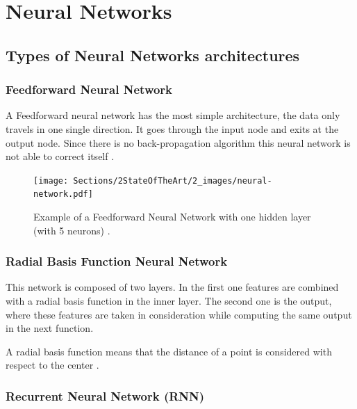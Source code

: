 \appendix
\chapter{Neural Networks}

\label{ch:appendix}

\section{Types of Neural Networks architectures}

            \subsection{Feedforward Neural Network}
            
            \par A Feedforward neural network has the most simple architecture, the data only travels in one single direction. It goes through the input node and exits at the output node. Since there is no back-propagation algorithm this neural network is not able to correct itself \cite{ArmaanMerchant2018} \cite{VikasGupta2017}.

            \begin{figure}[H]
                \centering
                \captionsetup{justification=centering}
                \texttt{[image: Sections/2StateOfTheArt/2\_images/neural-network.pdf]}
                \caption[Feedforward Neural Network]{Example of a Feedforward Neural Network with one hidden layer (with 5 neurons) \cite{neural_image}. }  
            \end{figure}

            \subsection{Radial Basis Function Neural Network}

            \par This network is composed of two layers. In the first one features are combined with a radial basis function in the inner layer. The second one is the output, where these features are taken in consideration while computing the same output in the next function.
            \par A radial basis function means that the distance of a point is considered with respect to the center \cite{ArmaanMerchant2018}.


            \subsection{Recurrent Neural Network (RNN)} 

